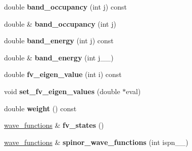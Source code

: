 \begin{DoxyCompactItemize}
\item 
\hypertarget{classsirius_1_1_k__point_a3b31410964e4962f198194b1673ffe3c}{}double {\bfseries band\+\_\+occupancy} (int j) const \label{classsirius_1_1_k__point_a3b31410964e4962f198194b1673ffe3c}

\item 
\hypertarget{classsirius_1_1_k__point_a571119d579d461de06b5373198b9de3b}{}double \& {\bfseries band\+\_\+occupancy} (int j)\label{classsirius_1_1_k__point_a571119d579d461de06b5373198b9de3b}

\item 
\hypertarget{classsirius_1_1_k__point_a953d414efb18e284b1599be4b09b289c}{}double {\bfseries band\+\_\+energy} (int j) const \label{classsirius_1_1_k__point_a953d414efb18e284b1599be4b09b289c}

\item 
\hypertarget{classsirius_1_1_k__point_abb7e0e18142d7a19b83e00e38a375951}{}double \& {\bfseries band\+\_\+energy} (int j\+\_\+\+\_\+)\label{classsirius_1_1_k__point_abb7e0e18142d7a19b83e00e38a375951}

\item 
\hypertarget{classsirius_1_1_k__point_abcd5a4d547e5b9e7ab48dd61ef40e6e4}{}double {\bfseries fv\+\_\+eigen\+\_\+value} (int i) const \label{classsirius_1_1_k__point_abcd5a4d547e5b9e7ab48dd61ef40e6e4}

\item 
\hypertarget{classsirius_1_1_k__point_a5516f6f3366357e97f93e9b75466b995}{}void {\bfseries set\+\_\+fv\+\_\+eigen\+\_\+values} (double $\ast$eval)\label{classsirius_1_1_k__point_a5516f6f3366357e97f93e9b75466b995}

\item 
\hypertarget{classsirius_1_1_k__point_a4ad1629f529787c05f994915e5fd529b}{}double {\bfseries weight} () const \label{classsirius_1_1_k__point_a4ad1629f529787c05f994915e5fd529b}

\item 
\hypertarget{classsirius_1_1_k__point_ae1da719fc03aea9a97f36fb114b82eaf}{}\hyperlink{classsddk_1_1wave__functions}{wave\+\_\+functions} \& {\bfseries fv\+\_\+states} ()\label{classsirius_1_1_k__point_ae1da719fc03aea9a97f36fb114b82eaf}

\item 
\hypertarget{classsirius_1_1_k__point_adb775314400a0a6c2e9b5a31464569fb}{}\hyperlink{classsddk_1_1wave__functions}{wave\+\_\+functions} \& {\bfseries spinor\+\_\+wave\+\_\+functions} (int ispn\+\_\+\+\_\+)\label{classsirius_1_1_k__point_adb775314400a0a6c2e9b5a31464569fb}


\end{DoxyCompactItemize}
